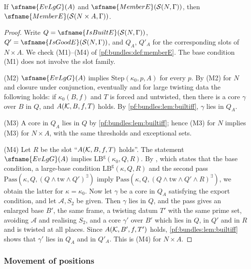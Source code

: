 \begin{lemma}\label{pf:bundles:lem:atprop}
If $\sfname{EvLgG}(A)$ and $\sfname{MemberE}(\bundS(N,\Gamma))$, then $\sfname{MemberE}(\bundS(N\times A,\Gamma))$.
\end{lemma}

\begin{proof}
Write $Q=\sfname{IsBuiltE}(\bundS(N,\Gamma))$, $Q'=\sfname{IsGoodE}(\bundS(N,\Gamma))$, and $Q_A$, $Q'_A$ for the corresponding slots of
$N\times A$. We check (M1)--(M4) of \cref{pf:bundles:def:memberE}. The base condition (M1) does not involve the slot family.

(M2) $\sfname{EvLgG}(A)$ implies $\mathrm{Step}(\kappa_0,p,A)$ for every $p$. By (M2) for $N$ and closure under conjunction, eventually and
for large twisting data the following holds: if $\kappa_0(B,f)$ and $T$ is forced and untwisted, then there is a core $\gamma$ over $B$ in
$Q$, and $A(\mathcal K,B,f,T)$ holds. By \cref{pf:bundles:lem:builtiff}, $\gamma$ lies in $Q_A$.

(M3) A core in $Q_A$ lies in $Q$ by \cref{pf:bundles:lem:builtiff}; hence (M3) for $N$ implies (M3) for $N\times A$, with the same thresholds
and exceptional sets.

(M4) Let $R$ be the slot ``$A(\mathcal K,B,f,T)$ holds''. The statement $\sfname{EvLgG}(A)$ implies $\mathrm{LB}^{\mathrm g}(\kappa_0,Q,R)$.
By , which states that the base condition, a large-base
condition $\mathrm{LB}^{\mathrm g}(\kappa,Q,R)$ and the second pass $\mathrm{Pass}(\kappa,Q,(Q\wedge\mathrm{tw}\wedge Q')^\exists)$ imply
$\mathrm{Pass}(\kappa,Q,(Q\wedge\mathrm{tw}\wedge Q'\wedge R)^\exists)$, we obtain the latter for $\kappa=\kappa_0$. Now let $\gamma$ be a core in
$Q_A$ satisfying the export condition, and let $\mathcal A,S_2$ be given. Then $\gamma$ lies in $Q$, and the pass gives an enlarged base
$B'$, the same frame, a twisting datum $T'$ with the same prime set, avoiding $\mathcal A$ and realising $S_2$, and a core $\gamma'$ over
$B'$ which lies in $Q$, in $Q'$ and in $R$ and is twisted at all places. Since $A(\mathcal K,B',f,T')$ holds, \cref{pf:bundles:lem:builtiff}
shows that $\gamma'$ lies in $Q_A$ and in $Q'_A$. This is (M4) for $N\times A$.
\end{proof}

\subsubsection{Movement of positions}\label{pf:bundles:mv}

